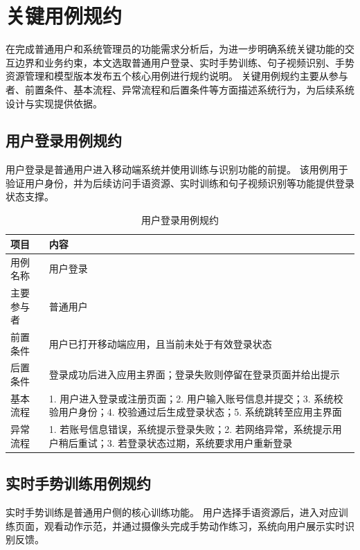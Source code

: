 
\section{关键用例规约}

在完成普通用户和系统管理员的功能需求分析后，为进一步明确系统关键功能的交互边界和业务约束，本文选取普通用户登录、实时手势训练、句子视频识别、手势资源管理和模型版本发布五个核心用例进行规约说明。
关键用例规约主要从参与者、前置条件、基本流程、异常流程和后置条件等方面描述系统行为，为后续系统设计与实现提供依据。

\subsection{用户登录用例规约}

用户登录是普通用户进入移动端系统并使用训练与识别功能的前提。
该用例用于验证用户身份，并为后续访问手语资源、实时训练和句子视频识别等功能提供登录状态支撑。

\begin{longtable}{p{}p{}}
  \caption{用户登录用例规约}
  \label{tab:user-login-usecase}\\
  \toprule
  \textbf{项目} & \textbf{内容} \\
  \midrule
  用例名称 & 用户登录 \\
  主要参与者 & 普通用户 \\
  前置条件 & 用户已打开移动端应用，且当前未处于有效登录状态 \\
  后置条件 & 登录成功后进入应用主界面；登录失败则停留在登录页面并给出提示 \\
  基本流程 & 1. 用户进入登录或注册页面；2. 用户输入账号信息并提交；3. 系统校验用户身份；4. 校验通过后生成登录状态；5. 系统跳转至应用主界面 \\
  异常流程 & 1. 若账号信息错误，系统提示登录失败；2. 若网络异常，系统提示用户稍后重试；3. 若登录状态过期，系统要求用户重新登录 \\
  \bottomrule
\end{longtable}

\subsection{实时手势训练用例规约}

实时手势训练是普通用户侧的核心训练功能。
用户选择手语资源后，进入对应训练页面，观看动作示范，并通过摄像头完成手势动作练习，系统向用户展示实时识别反馈。

